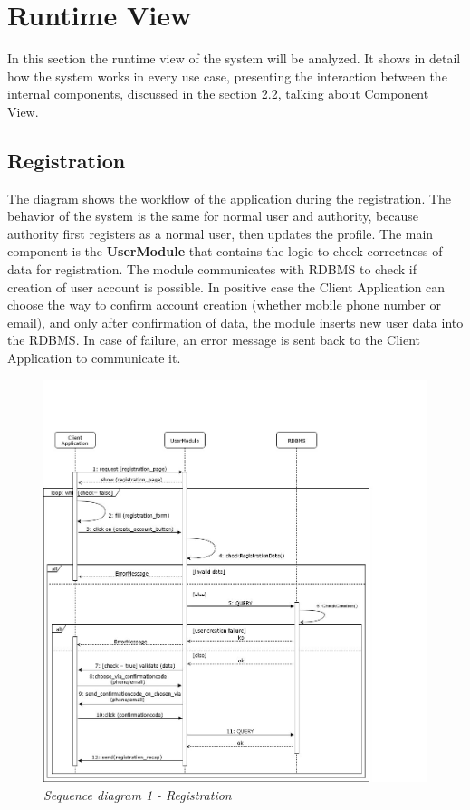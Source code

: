 \section{Runtime View}
In this section the runtime view of the system will be analyzed. It shows in detail how the system works in every use case, 
presenting the interaction between the internal components, discussed in the section 2.2, talking about Component View.

\subsection{Registration}
The diagram shows the workflow of the application during the registration. The behavior of 
the system is the same for normal user and authority, because authority first registers as a normal user, then updates the profile. The main 
component is the \textbf{UserModule} that contains the logic to check correctness of data for registration. The module communicates with RDBMS
to check if creation of user account is possible. In positive case the Client Application can choose the way to confirm account creation (whether
mobile phone number or email), and only after confirmation of data, the module inserts new user data into the RDBMS. In case of failure, an error 
message is sent back to the Client Application to communicate it. 

\begin{figure}[H]
  \centering
  \includegraphics[width=\textwidth]{DD_Images/RuntimeView/1.jpg}
  \caption{\textit{Sequence diagram 1 - Registration}}
\end{figure}

